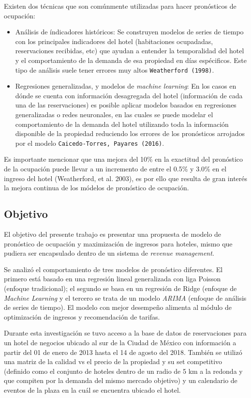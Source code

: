 Existen dos técnicas que son comúnmente utilizadas para hacer pronósticos de ocupación:
\begin{itemize}
  \item Análisis de índicadores históricos: Se construyen modelos de series de tiempo con los principales indicadores del hotel (habitaciones ocupadadas, reservaciones recibidas, etc) que ayudan a entender la temporalidad del hotel y el comportamiento de la demanda de esa propiedad en días espécificos. Este tipo de análisis suele tener errores muy altos \texttt{Weatherford (1998)}.
  \item Regresiones generalizadas, y modelos de \emph{machine learning}: En los casos en dónde se cuenta con información desagregada del hotel (información de cada una de las reservaciones) es posible aplicar modelos basados en regresiones generalizadas o redes neuronales, en las cuales se puede modelar el comportamiento de la demanda del hotel utilizando toda la información disponible de la propiedad reduciendo los errores de los pronósticos arrojados por el modelo \texttt{Caicedo-Torres, Payares (2016)}.
\end{itemize}
Es importante mencionar que una mejora del 10\% en la exactitud del pronóstico de la ocupación puede llevar a un incremento de entre el 0.5\% y 3.0\% en el ingreso del hotel (Weatherford, et al. 2003), es por ello que resulta de gran interés la mejora continua de los módelos de pronóstico de ocupación.
\subsection*{Objetivo}
El objetivo del presente trabajo es presentar una propuesta de modelo de pronóstico de ocupación y maximización de ingresos para hoteles, mismo que pudiera ser encapsulado dentro de un sistema de \emph{revenue management}. 

Se analizó el comportamiento de tres modelos de pronóstico diferentes. El primero está basado en una regresión lineal generalizada con liga Poisson (enfoque tradicional); el segundo se basa en un regresión de Ridge (enfoque de \emph{Machine Learning} y el tercero se trata de un modelo \emph{ARIMA} (enfoque de análisis de series de tiempo). El modelo con mejor desempeño alimenta al módulo de optimización de ingresos y recomendación de tarifas.

Durante esta investigación se tuvo acceso a la base de datos de reservaciones para un hotel de negocios ubicado al sur de la Ciudad de México con información a partir del 01 de enero de 2013 hasta el 14 de agosto del 2018. También se utilizó una matriz de la calidad vs el precio de la propiedad y su set competitivo (definido como el conjunto de hoteles dentro de un radio de 5 km a la redonda y que compiten por la demanda del mismo mercado objetivo) y un calendario de eventos de la plaza en la cuál se encuentra ubicado el hotel.

